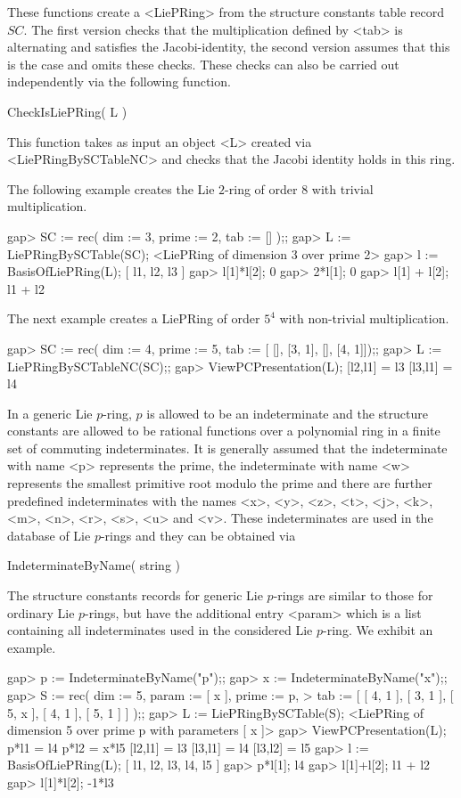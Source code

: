 These functions create a <LiePRing> from the structure constants table
record $SC$. The first version checks that the multiplication defined by
<tab> is alternating and satisfies the Jacobi-identity, the second version
assumes that this is the case and omits these checks. These checks can
also be carried out independently via the following function.

\> CheckIsLiePRing( L )

This function takes as input an object <L> created via <LiePRingBySCTableNC>
and checks that the Jacobi identity holds in this ring.

The following example creates the Lie $2$-ring of order $8$ with trivial 
multiplication.  

\beginexample
gap> SC := rec( dim := 3, prime := 2, tab := [] );;
gap> L := LiePRingBySCTable(SC);
<LiePRing of dimension 3 over prime 2>
gap> l := BasisOfLiePRing(L);
[ l1, l2, l3 ]
gap> l[1]*l[2];
0
gap> 2*l[1];
0
gap> l[1] + l[2];
l1 + l2
\endexample

The next example creates a LiePRing of order $5^4$ with non-trivial 
multiplication.

\beginexample
gap> SC := rec( dim := 4, prime := 5, tab := [ [], [3, 1], [], [4, 1]]);;
gap> L := LiePRingBySCTableNC(SC);;
gap> ViewPCPresentation(L);
[l2,l1] = l3
[l3,l1] = l4
\endexample


In a generic Lie $p$-ring, $p$ is allowed to be an indeterminate and 
the structure constants are allowed to be rational functions over a 
polynomial ring in a finite set of 
commuting indeterminates. It is generally assumed that the indeterminate
with name <p> represents the prime, the indeterminate with name <w> 
represents the smallest primitive root modulo the prime and there are 
further predefined indeterminates with the names <x>, <y>, <z>, <t>, 
<j>, <k>, <m>, <n>, <r>, <s>, <u> and <v>. These indeterminates are used 
in the database of Lie $p$-rings and they can be obtained via

\> IndeterminateByName( string )

The structure constants records for generic Lie $p$-rings are similar to
those for ordinary Lie $p$-rings, but have the additional entry <param>
which is a list containing all indeterminates used in the considered Lie
$p$-ring. We exhibit an example.

\beginexample
gap> p := IndeterminateByName("p");;
gap> x := IndeterminateByName("x");;
gap> S := rec( dim := 5, 
               param := [ x ], 
               prime := p, 
>              tab := [ [ 4, 1 ], [ 3, 1 ], [ 5, x ], [ 4, 1 ], [ 5, 1 ] ] );;
gap> L := LiePRingBySCTable(S);
<LiePRing of dimension 5 over prime p with parameters [ x ]>
gap> ViewPCPresentation(L);
p*l1 = l4
p*l2 = x*l5
[l2,l1] = l3
[l3,l1] = l4
[l3,l2] = l5
gap> l := BasisOfLiePRing(L);
[ l1, l2, l3, l4, l5 ]
gap> p*l[1];
l4
gap> l[1]+l[2];
l1 + l2
gap> l[1]*l[2];
-1*l3
\endexample


